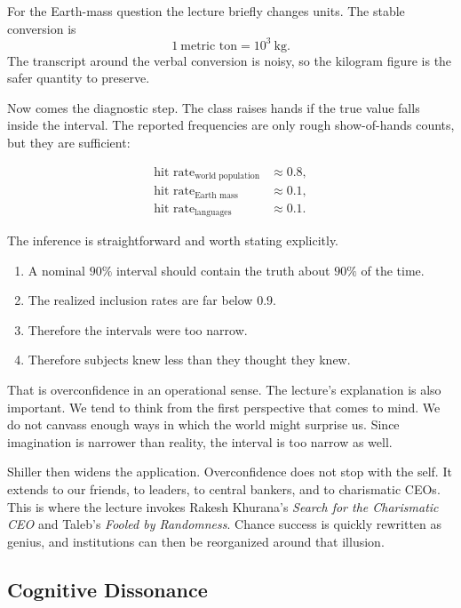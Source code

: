 For the Earth-mass question the lecture briefly changes units. The stable conversion is
\begin{equation}
1\ \text{metric ton}=10^3\ \text{kg}.
\end{equation}
The transcript around the verbal conversion is noisy, so the kilogram figure is the safer quantity to preserve.

Now comes the diagnostic step. The class raises hands if the true value falls inside the interval. The reported frequencies are only rough show-of-hands counts, but they are sufficient:

\begin{align}
\text{hit rate}_{\text{world population}} &\approx 0.8,\\
\text{hit rate}_{\text{Earth mass}} &\approx 0.1,\\
\text{hit rate}_{\text{languages}} &\approx 0.1.
\end{align}

The inference is straightforward and worth stating explicitly.

\begin{enumerate}
\item A nominal \(90\%\) interval should contain the truth about \(90\%\) of the time.
\item The realized inclusion rates are far below \(0.9\).
\item Therefore the intervals were too narrow.
\item Therefore subjects knew less than they thought they knew.
\end{enumerate}

That is overconfidence in an operational sense. The lecture's explanation is also important. We tend to think from the first perspective that comes to mind. We do not canvass enough ways in which the world might surprise us. Since imagination is narrower than reality, the interval is too narrow as well.

Shiller then widens the application. Overconfidence does not stop with the self. It extends to our friends, to leaders, to central bankers, and to charismatic CEOs. This is where the lecture invokes Rakesh Khurana's \emph{Search for the Charismatic CEO} and Taleb's \emph{Fooled by Randomness}. Chance success is quickly rewritten as genius, and institutions can then be reorganized around that illusion.

\subsection{Cognitive Dissonance}

